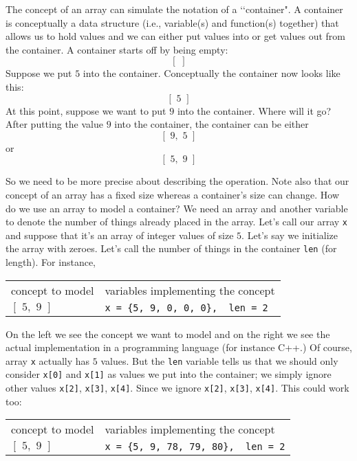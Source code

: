 The concept of an array can simulate the notation of a \lq\lq container".
A container is conceptually a data structure (i.e., variable(s) and 
function(s) together) that allows us to hold values and we can either put
values into or get values out from the container. A container starts off by
being empty:
\[[\,\,]\]
Suppose we put $5$ into the container. Conceptually the container now looks
like this:
\[[\,\,5\,\,]\]
At this point, suppose we want to put $9$ into the container. Where will it
go? After putting the value $9$ into the container, the container can be either
\[[\,\,9,\,\,5\,\,]\]
or
\[[\,\,5,\,\,9\,\,]\]

So we need to be more precise about describing the operation. Note also that
our concept of an array has a fixed size whereas a container's size can change.
How do we use an array to model a container? We need an array and another
variable to denote the number of things already placed in the array. Let's call
our array \verb!x! and suppose that it's an array of integer values of size
$5$. Let's say we initialize the array with zeroes. Let's call the number of
things in the container \verb!len! (for length). For instance,

\begin{longtable}{ll}
concept to model & \hspace{3 cm}variables implementing the concept \\
$[\,\,5,\,\,9\,\,]$ & \hspace{3 cm}\verb!x = {5, 9, 0, 0, 0},  len = 2!
\end{longtable}

On the left we see the concept we want to model and on the right we see the
actual implementation in a programming language (for instance C++.) Of course,
array \verb!x! actually has $5$ values. But the \verb!len! variable tells us
that we should only consider \verb!x[0]! and \verb!x[1]! as values we put into
the container; we simply ignore other values
\verb!x[2]!,
\verb!x[3]!,
\verb!x[4]!.
Since we ignore \verb!x[2]!,
\verb!x[3]!,
\verb!x[4]!.
This could work too:

\begin{longtable}{ll}
concept to model & \hspace{3 cm}variables implementing the concept \\
$[\,\,5,\,\,9\,\,]$ & \hspace{3 cm}\verb!x = {5, 9, 78, 79, 80},  len = 2!
\end{longtable}

